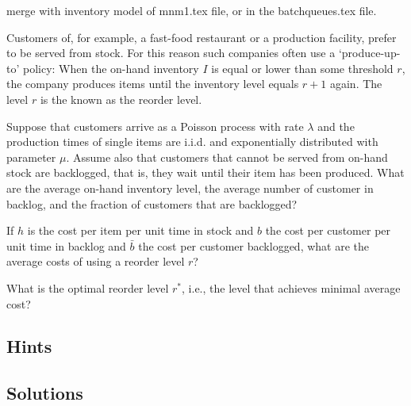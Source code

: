 \begin{question}[use=false]
\label{q:basestock}

merge with inventory model of mnm1.tex file, or in the batchqueues.tex file.

Customers of, for example, a fast-food restaurant or a production
facility, prefer to be served from stock. For this reason such
companies often use a `produce-up-to' policy: When the on-hand
inventory $I$ is equal or lower than some threshold $r$, the company
produces items until the inventory level equals $r+1$ again. The level
$r$ is the known as the reorder level.

Suppose that customers arrive as a Poisson process with rate $\lambda$
and the production times of single items are i.i.d. and exponentially
distributed with parameter $\mu$. Assume also that customers that
cannot be served from on-hand stock are backlogged, that is, they wait
until their item has been produced. What are the average on-hand
inventory level, the average number of customer in backlog, and the
fraction of customers that are backlogged?

If $h$ is the cost per item per unit time in stock and $b$ the cost
per customer per unit time in backlog and $\bar b$ the cost per customer
backlogged, what are the average costs of using a reorder level $r$? 

What is the optimal reorder level $r^*$, i.e., the level that achieves
minimal average cost?

\begin{hint}
  
\end{hint}

  \begin{solution}
  \end{solution}
\end{question}


\subsection*{Hints}

\subsection*{Solutions}


